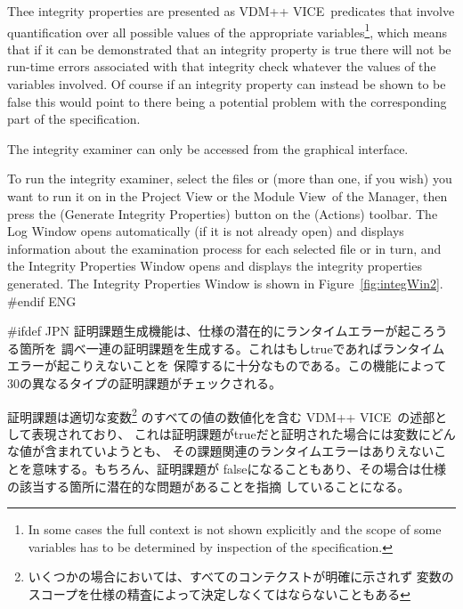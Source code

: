 \documentclass[\pformat,12pt]{article}
\newcommand{\vdmslpp}{VDM-SL}
\newcommand{\vdmModView}{\guicmd{Module View}}
\newcommand{\vdmModView}{\guicmd{モジュールビュー}}
\newcommand{\vdmslpp}{VDM++}
\renewcommand{\vdmslpp}{VDM++ VICE}
\newcommand{\vdmModView}{\guicmd{VDM View}}
\newcommand{\vdmModView}{\guicmd{VDMビュー}}
\newcommand{\guicmd}[1]{{\sf #1}}
\newcommand{\guicmd}[1]{{\gt #1}}
\begin{document}
Thee integrity properties are presented as \vdmslpp\ predicates that 
involve quantification over all possible values of the appropriate
variables\footnote{In some cases the full context is not shown
  explicitly and the scope of some variables has to be determined by
  inspection of the specification.}, which means that if it can be
demonstrated that an integrity property is true there will not be
run-time errors associated with that integrity check whatever the
values of the variables involved. Of course if an integrity property
can instead be shown to be false this would point to there being a
potential problem with the corresponding part of the specification.

The integrity examiner can only be accessed from the graphical
interface. 

To run the integrity examiner, select the files or
 (more than one, if you
wish) you want to run it on in the \guicmd{Project View} or the
\vdmModView\ of the \guicmd{Manager}, then press the
(\guicmd{Generate Integrity Properties}) button on the (\guicmd{Actions})
toolbar. The \guicmd{Log Window} opens automatically (if it is not
already open) and displays information about the examination process
for each selected file or 
in turn, and the \guicmd{Integrity Properties Window} opens and
displays the integrity properties generated. The \guicmd{Integrity
  Properties Window} is shown in Figure~\ref{fig:integWin2}.
#endif ENG

#ifdef JPN
証明課題生成機能は、仕様の潜在的にランタイムエラーが起ころうる箇所を
調べ一連の証明課題を生成する。これはもしtrueであればランタイムエラーが起こりえないことを
保障するに十分なものである。この機能によって30の異なるタイプの証明課題がチェックされる。

証明課題は適切な変数\footnote{いくつかの場合においては、すべてのコンテクストが明確に示されず
  変数のスコープを仕様の精査によって決定しなくてはならないこともある} のすべての値の数値化を含む
\vdmslpp\ の述部として表現されており、
これは証明課題がtrueだと証明された場合には変数にどんな値が含まれていようとも、
その課題関連のランタイムエラーはありえないことを意味する。もちろん、証明課題が
falseになることもあり、その場合は仕様の該当する箇所に潜在的な問題があることを指摘
していることになる。
\end{document}

